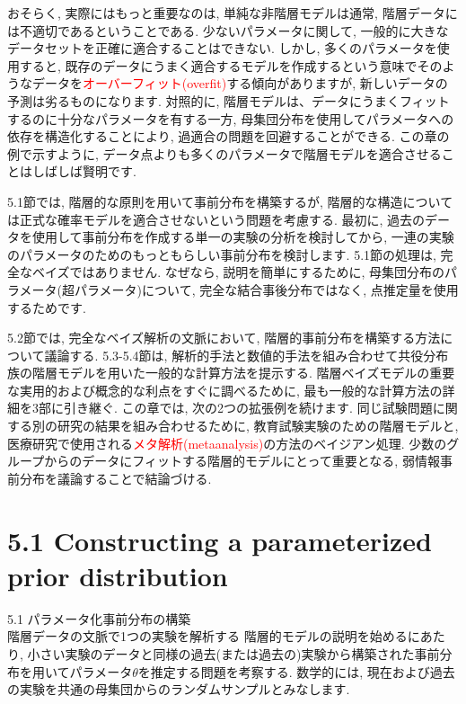 \documentclass[10pt,dvipdfmx,a4]{beamer}
\newcommand{\tcr}[1]{\textcolor{red}{#1}}
\begin{document}

\begin{frame}
おそらく, 実際にはもっと重要なのは, 単純な非階層モデルは通常, 階層データには不適切であるということである.
少ないパラメータに関して, 一般的に大きなデータセットを正確に適合することはできない.
しかし, 多くのパラメータを使用すると, 既存のデータにうまく適合するモデルを作成するという意味でそのようなデータを\tcr{オーバーフィット(overfit)}する傾向がありますが, 新しいデータの予測は劣るものになります.
対照的に, 階層モデルは、データにうまくフィットするのに十分なパラメータを有する一方, 母集団分布を使用してパラメータへの依存を構造化することにより, 過適合の問題を回避することができる.
この章の例で示すように, データ点よりも多くのパラメータで階層モデルを適合させることはしばしば賢明です.

5.1節では, 階層的な原則を用いて事前分布を構築するが, 階層的な構造については正式な確率モデルを適合させないという問題を考慮する.
最初に, 過去のデータを使用して事前分布を作成する単一の実験の分析を検討してから, 一連の実験のパラメータのためのもっともらしい事前分布を検討します.
5.1節の処理は, 完全なベイズではありません.
なぜなら, 説明を簡単にするために, 母集団分布のパラメータ(超パラメータ)について, 完全な結合事後分布ではなく, 点推定量を使用するためです.
\end{frame}


\begin{frame}
5.2節では, 完全なベイズ解析の文脈において, 階層的事前分布を構築する方法について議論する.
5.3-5.4節は, 解析的手法と数値的手法を組み合わせて共役分布族の階層モデルを用いた一般的な計算方法を提示する.
階層ベイズモデルの重要な実用的および概念的な利点をすぐに調べるために, 最も一般的な計算方法の詳細を3部に引き継ぐ.
この章では, 次の2つの拡張例を続けます.
同じ試験問題に関する別の研究の結果を組み合わせるために, 教育試験実験のための階層モデルと, 医療研究で使用される\tcr{メタ解析(metaanalysis)}の方法のベイジアン処理.
少数のグループからのデータにフィットする階層的モデルにとって重要となる, 弱情報事前分布を議論することで結論づける.
\end{frame}

\section{5.1 Constructing a parameterized prior distribution}
\begin{frame}{5.1 パラメータ化事前分布の構築\\階層データの文脈で1つの実験を解析する}
階層的モデルの説明を始めるにあたり, 小さい実験のデータと同様の過去(または過去の)実験から構築された事前分布を用いてパラメータ$\theta$を推定する問題を考察する.
数学的には, 現在および過去の実験を共通の母集団からのランダムサンプルとみなします.
\end{frame}
\end{document}
